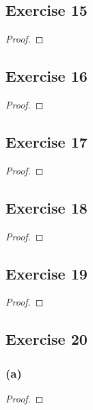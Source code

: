 \documentclass[14pt]{extarticle}
\begin{document}
\subsection{Exercise 15}

\begin{proof}

\end{proof}

\subsection{Exercise 16}

\begin{proof}

\end{proof}

\subsection{Exercise 17}

\begin{proof}

\end{proof}

\subsection{Exercise 18}

\begin{proof}

\end{proof}

\subsection{Exercise 19}

\begin{proof}

\end{proof}

\subsection{Exercise 20}

\subsubsection{(a)}

\begin{proof}

\end{proof}
\end{document}

